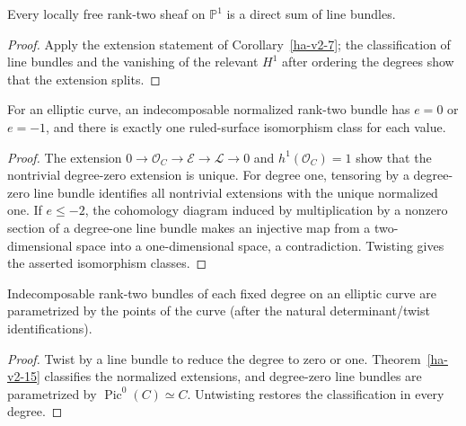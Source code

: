 \begin{corollary}
\label{ha-v2-14}
Every locally free rank-two sheaf on \(\mathbb P^1\) is a direct sum of line
bundles.
\end{corollary}
\begin{proof}
Apply the extension statement of Corollary~\ref{ha-v2-7}; the classification
of line bundles and the vanishing of the relevant \(H^1\) after ordering the
degrees show that the extension splits.
\end{proof}

\begin{theorem}
\label{ha-v2-15}
For an elliptic curve, an indecomposable normalized rank-two bundle has
\(e=0\) or \(e=-1\), and there is exactly one ruled-surface isomorphism class
for each value.

\end{theorem}
\begin{proof}
The extension \(0\to\mathcal O_C\to\mathcal E\to\mathcal L\to0\) and
\(h^1(\mathcal O_C)=1\) show that the nontrivial degree-zero extension is unique.
For degree one, tensoring by a degree-zero line bundle identifies all nontrivial
extensions with the unique normalized one.  If \(e\le-2\), the cohomology
diagram induced by multiplication by a nonzero section of a degree-one line
bundle makes an injective map from a two-dimensional space into a one-dimensional
space, a contradiction.  Twisting gives the asserted isomorphism classes.
\end{proof}

\begin{corollary}
\label{ha-v2-16}
Indecomposable rank-two bundles of each fixed degree on an elliptic curve are
parametrized by the points of the curve (after the natural determinant/twist
identifications).
\end{corollary}
\begin{proof}
Twist by a line bundle to reduce the degree to zero or one.  Theorem~\ref{ha-v2-15}
classifies the normalized extensions, and degree-zero line bundles are
parametrized by \(\operatorname{Pic}^0(C)\simeq C\).  Untwisting restores the
classification in every degree.
\end{proof}

